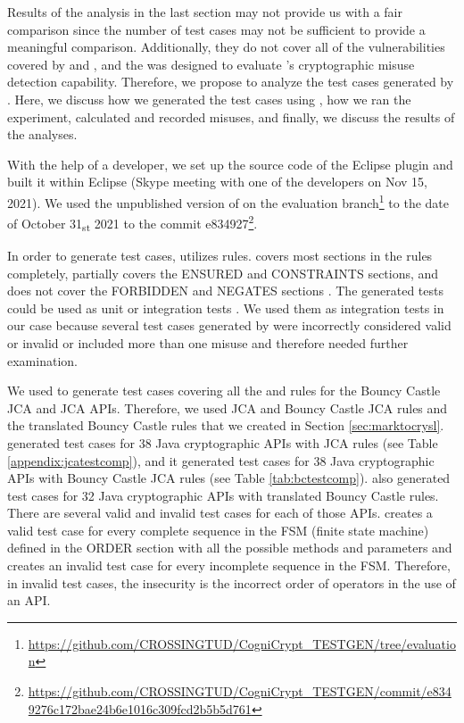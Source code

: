Results of the analysis in the last section may not provide us with a fair comparison since the number of test cases may not be sufficient to provide a meaningful comparison. Additionally, they do not cover all of the vulnerabilities covered by \codyze{} and \cognicryptsast, and the \cryptoapibench{} was designed to evaluate \cryptoguard's cryptographic misuse detection capability. Therefore, we propose to analyze the test cases generated by \cognicryptsast. Here, we discuss how we generated the test cases using \cognicrypttestgen, how we ran the experiment, calculated and recorded misuses, and finally, we discuss the results of the analyses.

With the help of a \cognicrypttestgen{} developer, we set up the source code of the \cognicrypttestgen{} Eclipse plugin and built it within Eclipse (Skype meeting with one of the \cognicrypttestgen{} developers on Nov 15, 2021). We used the unpublished version of \cognicrypttestgen{} on the evaluation branch\footnote{\url{https://github.com/CROSSINGTUD/CogniCrypt_TESTGEN/tree/evaluation}} to the date of October 31\textsubscript{st} 2021 to the commit e834927\footnote{\url{https://github.com/CROSSINGTUD/CogniCrypt_TESTGEN/commit/e8349276c172bae24b6e1016c309fcd2b5b5d761}}.

In order to generate test cases, \cognicrypttestgen{} utilizes \crysl{} rules. \cognicrypttestgen{} covers most sections in the \crysl{} rules completely, partially covers the ENSURED and CONSTRAINTS sections, and does not cover the FORBIDDEN and NEGATES sections \cite{rakshit}. The generated tests could be used as unit or integration tests \cite{rakshit}. We used them as integration tests in our case because several test cases generated by \cognicrypttestgen{} were incorrectly considered valid or invalid or included more than one misuse and therefore needed further examination.

We used \cognicrypttestgen{} to generate test cases covering all the \MARK{} and \crysl{} rules for the Bouncy Castle JCA and JCA APIs. Therefore, we used JCA and Bouncy Castle JCA \crysl{} rules and the translated Bouncy Castle \crysl{} rules that we created in Section \ref{sec:marktocrysl}. \cognicrypttestgen{} generated test cases for 38 Java cryptographic APIs with JCA \crysl{} rules (see Table \ref{appendix:jcatestcomp}), and it generated test cases for 38 Java cryptographic APIs with Bouncy Castle JCA \crysl{} rules (see Table \ref{tab:bctestcomp}). \cognicrypttestgen{} also generated test cases for 32 Java cryptographic APIs with translated Bouncy Castle \crysl{} rules. There are several valid and invalid test cases for each of those APIs. \cognicrypttestgen{} creates a valid test case for every complete sequence in the FSM (finite state machine) defined in the ORDER section with all the possible methods and parameters and creates an invalid test case for every incomplete sequence in the FSM. Therefore, in invalid test cases, the insecurity is the incorrect order of operators in the use of an API.

